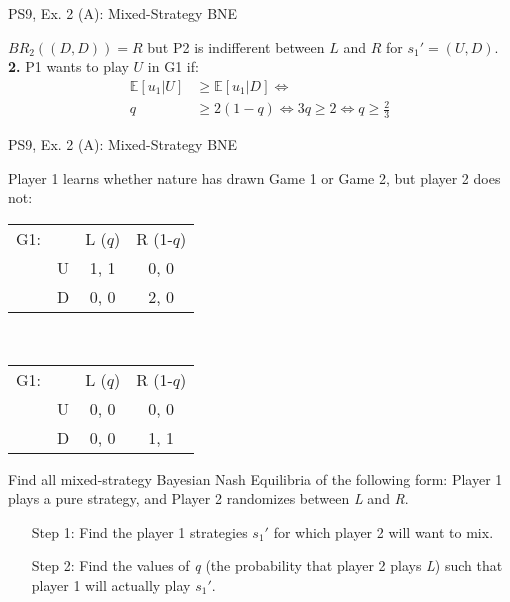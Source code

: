 \begin{frame}{PS9, Ex. 2 (A): Mixed-Strategy BNE}
\begin{multicols}{2}
      $BR_2((D,D))=R$ but P2 is indifferent between $L$ and $R$ for $s_1'=(U,D)$.\\\medskip
      \textbf{2.} P1 wants to play $U$ in G1 if:
      \begin{align*}
        \mathbb{E}[u_1|U]&\geq \mathbb{E}[u_1|D]\Leftrightarrow\\
        q&\geq2(1-q)\Leftrightarrow 3q\geq2 \Leftrightarrow q\geq\frac{2}{3}
      \end{align*}
      \vfill\null
    \end{multicols}
\end{frame}
\begin{frame}{PS9, Ex. 2 (A): Mixed-Strategy BNE}
    \begin{multicols}{2}
      Player 1 learns whether nature has drawn Game 1 or Game 2, but player 2 does not:
      \begin{table}
        \vspace{-4pt}
        \begin{tabular}{ll|c|c|}
          \multicolumn{1}{c}{G1:} & \multicolumn{1}{c}{} & \multicolumn{1}{c}{L ($q$)} & \multicolumn{1}{c}{R (1-$q$)} \\\cline{3-4}
          & U & 1, 1 & 0, 0 \\\cline{3-4}
          & D & 0, 0 & 2, 0 \\\cline{3-4}
        \end{tabular}\\\medskip
        \begin{tabular}{ll|c|c|}
          \multicolumn{1}{c}{G1:} & \multicolumn{1}{c}{} & \multicolumn{1}{c}{L ($q$)} & \multicolumn{1}{c}{R (1-$q$)} \\\cline{3-4}
          & U & 0, 0 & 0, 0 \\\cline{3-4}
          & D & 0, 0 & 1, 1 \\\cline{3-4}
        \end{tabular}
      \end{table}
      \vspace{-4pt}
      Find all mixed-strategy Bayesian Nash Equilibria of the following form: Player 1 plays a pure strategy, and Player 2 randomizes between \textit{L} and \textit{R}.
      \vspace{-4pt}
      \begin{itemize}
        \item[Step 1:] Find the player 1 strategies $s_1'$ for which player 2 will want to mix.
        \item[Step 2:] Find the values of \textit{q} (the probability that player 2 plays \textit{L}) such that player 1 will actually play $s_1'$.

\end{itemize}
\end{multicols}
\end{frame}
